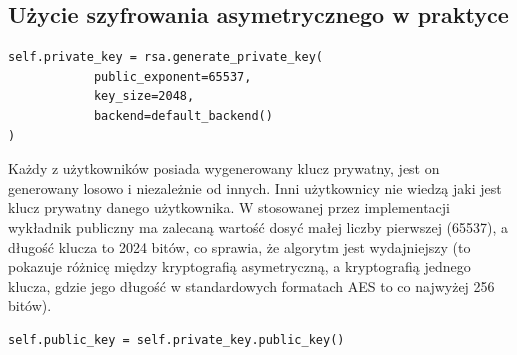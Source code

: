 \subsection{Użycie szyfrowania asymetrycznego w praktyce}
\begin{lstlisting}
self.private_key = rsa.generate_private_key(
            public_exponent=65537,
            key_size=2048,
            backend=default_backend()
)
\end{lstlisting}

Każdy z użytkowników posiada wygenerowany klucz prywatny, jest on generowany losowo i niezależnie od innych. Inni użytkownicy nie wiedzą jaki jest klucz prywatny danego użytkownika. W stosowanej przez implementacji wykładnik publiczny ma zalecaną wartość dosyć małej liczby pierwszej (65537), a długość klucza to 2024 bitów, co sprawia, że algorytm jest wydajniejszy (to pokazuje różnicę między kryptografią asymetryczną, a kryptografią jednego klucza, gdzie jego długość w standardowych formatach AES to co najwyżej 256 bitów).

\begin{lstlisting}
self.public_key = self.private_key.public_key()
\end{lstlisting}

